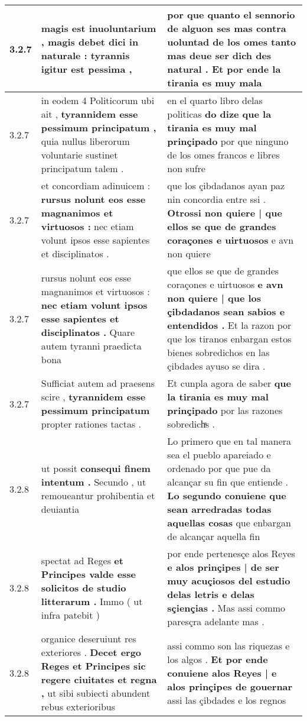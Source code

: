 \begin{tabular}{|p{1cm}|p{6.5cm}|p{6.5cm}|}
3.2.7 & magis est inuoluntarium , \textbf{ magis debet dici in naturale : } tyrannis igitur est pessima , & por que quanto el sennorio de alguon ses mas contra uoluntad de los omes \textbf{ tanto mas deue ser dich des natural . } Et por ende la tirania es muy mala \\\hline
3.2.7 & in eodem 4 Politicorum ubi ait , \textbf{ tyrannidem esse pessimum principatum , } quia nullus liberorum voluntarie sustinet principatum talem . & en el quarto libro delas politicas \textbf{ do dize que la tirania es muy mal prinçipado } por que ninguno de los omes francos e libres non sufre \\\hline
3.2.7 & et concordiam adinuicem : \textbf{ rursus nolunt eos esse magnanimos et virtuosos : } nec etiam volunt ipsos esse sapientes et disciplinatos . & que los çibdadanos ayan paz nin concordia entre ssi . \textbf{ Otrossi non quiere | que ellos se que de grandes coraçones e uirtuosos } e avn non quiere \\\hline
3.2.7 & rursus nolunt eos esse magnanimos et virtuosos : \textbf{ nec etiam volunt ipsos esse sapientes et disciplinatos . } Quare autem tyranni praedicta bona & que ellos se que de grandes coraçones e uirtuosos \textbf{ e avn non quiere | que los çibdadanos sean sabios e entendidos . } Et la razon por que los tiranos enbargan estos bienes sobredichos en las çibdades ayuso se dira . \\\hline
3.2.7 & Sufficiat autem ad praesens scire , \textbf{ tyrannidem esse pessimum principatum } propter rationes tactas . & Et cunpla agora de saber \textbf{ que la tirania es muy mal prinçipado } por las razones sobredichͣs . \\\hline
3.2.8 & ut possit \textbf{ consequi finem intentum . } Secundo , ut remoueantur prohibentia et deuiantia & Lo primero que en tal manera sea el pueblo apareiado e ordenado por que pue da alcançar su fin que entiende . \textbf{ Lo segundo conuiene que sean arredradas todas aquellas cosas } que enbargan de alcançar aquella fin \\\hline
3.2.8 & spectat ad Reges \textbf{ et Principes valde esse solicitos de studio litterarum . } Immo ( ut infra patebit ) & por ende pertenesçe alos Reyes \textbf{ e alos prinçipes | de ser muy acuçiosos del estudio delas letris e delas sçiençias . } Mas assi commo paresçra adelante mas . \\\hline
3.2.8 & organice deseruiunt res exteriores . \textbf{ Decet ergo Reges et Principes sic regere ciuitates et regna , } ut sibi subiecti abundent rebus exterioribus & assi commo son las riquezas e los algos . \textbf{ Et por ende conuiene alos Reyes | e alos prinçipes de gouernar } assi las çibdades e los regnos \\\hline

\end{tabular}
